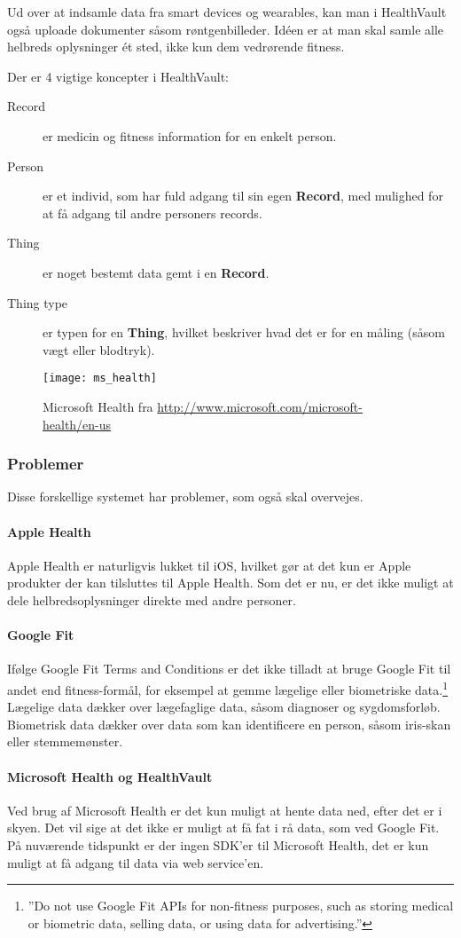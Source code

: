 Ud over at indsamle data fra smart devices og wearables, kan man i HealthVault også uploade dokumenter såsom røntgenbilleder.
Idéen er at man skal samle alle helbreds oplysninger ét sted, ikke kun dem vedrørende fitness.

Der er 4 vigtige koncepter i HealthVault:
\begin{description}
\item[Record] er medicin og fitness information for en enkelt person.
\item[Person] er et individ, som har fuld adgang til sin egen \textbf{Record}, med mulighed for at få adgang til andre personers records.
\item[Thing] er noget bestemt data gemt i en \textbf{Record}.
\item[Thing type] er typen for en \textbf{Thing}, hvilket beskriver hvad det er for en måling (såsom vægt eller blodtryk).
\end{description}

\begin{figure}
\centering
\texttt{[image: ms\_health]}
\caption{Microsoft Health fra \url{http://www.microsoft.com/microsoft-health/en-us}}
\label{eksisterende_systemer:ms_health_fig}
\end{figure}

\subsubsection{Problemer}
Disse forskellige systemet har problemer, som også skal overvejes.

\paragraph{Apple Health}
Apple Health er naturligvis lukket til iOS, hvilket gør at det kun er Apple produkter der kan tilsluttes til Apple Health.
Som det er nu, er det ikke muligt at dele helbredsoplysninger direkte med andre personer.

\paragraph{Google Fit}
Ifølge Google Fit Terms and Conditions er det ikke tilladt at bruge Google Fit til andet end fitness-formål, for eksempel at gemme lægelige eller biometriske data.\footnote{''Do not use Google Fit APIs for non-fitness purposes, such as storing medical or biometric data, selling data, or using data for advertising.''}
Lægelige data dækker over lægefaglige data, såsom diagnoser og sygdomsforløb.
Biometrisk data dækker over data som kan identificere en person, såsom iris-skan eller stemmemønster.

\paragraph{Microsoft Health og HealthVault}
Ved brug af Microsoft Health er det kun muligt at hente data ned, efter det er i skyen.
Det vil sige at det ikke er muligt at få fat i rå data, som ved Google Fit.
På nuværende tidspunkt er der ingen SDK'er til Microsoft Health, det er kun muligt at få adgang til data via web service'en.
